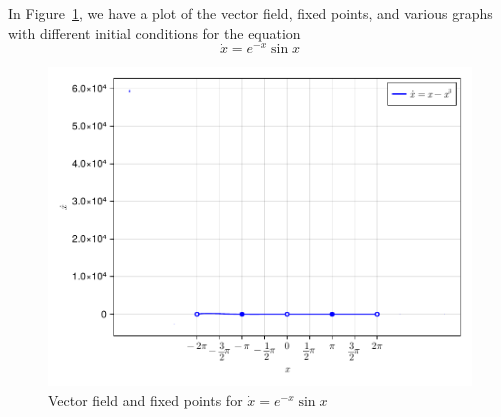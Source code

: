 
In Figure~\ref{fig2_2_4vecfield}, we have a plot of the vector field, fixed points,
and various graphs with different initial conditions for the equation 
\[
    \dot{x} = e^{-x}\sin{x}
\]
\begin{figure}[!ht]
    \includegraphics[scale=0.6, center]{../plots/ch02/ex2_2_4.pdf}
    \caption{Vector field and fixed points for $\dot{x} = e^{-x}\sin{x}$
        \label{fig2_2_4vecfield}}
\end{figure}
